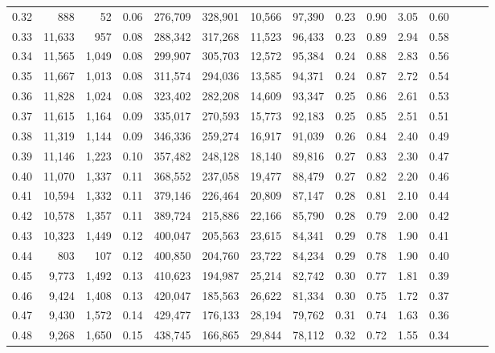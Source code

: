 \begin{tabular}{rrrrrrrrrrrrrrr}
0.32 &     888 &     52 &  0.06 &  276,709 &  328,901 &   10,566 &   97,390 &  0.23 &  0.90 &  3.05 &      0.60 \\
0.33 &  11,633 &    957 &  0.08 &  288,342 &  317,268 &   11,523 &   96,433 &  0.23 &  0.89 &  2.94 &      0.58 \\
0.34 &  11,565 &  1,049 &  0.08 &  299,907 &  305,703 &   12,572 &   95,384 &  0.24 &  0.88 &  2.83 &      0.56 \\
0.35 &  11,667 &  1,013 &  0.08 &  311,574 &  294,036 &   13,585 &   94,371 &  0.24 &  0.87 &  2.72 &      0.54 \\
0.36 &  11,828 &  1,024 &  0.08 &  323,402 &  282,208 &   14,609 &   93,347 &  0.25 &  0.86 &  2.61 &      0.53 \\
0.37 &  11,615 &  1,164 &  0.09 &  335,017 &  270,593 &   15,773 &   92,183 &  0.25 &  0.85 &  2.51 &      0.51 \\
0.38 &  11,319 &  1,144 &  0.09 &  346,336 &  259,274 &   16,917 &   91,039 &  0.26 &  0.84 &  2.40 &      0.49 \\
0.39 &  11,146 &  1,223 &  0.10 &  357,482 &  248,128 &   18,140 &   89,816 &  0.27 &  0.83 &  2.30 &      0.47 \\
0.40 &  11,070 &  1,337 &  0.11 &  368,552 &  237,058 &   19,477 &   88,479 &  0.27 &  0.82 &  2.20 &      0.46 \\
0.41 &  10,594 &  1,332 &  0.11 &  379,146 &  226,464 &   20,809 &   87,147 &  0.28 &  0.81 &  2.10 &      0.44 \\
0.42 &  10,578 &  1,357 &  0.11 &  389,724 &  215,886 &   22,166 &   85,790 &  0.28 &  0.79 &  2.00 &      0.42 \\
0.43 &  10,323 &  1,449 &  0.12 &  400,047 &  205,563 &   23,615 &   84,341 &  0.29 &  0.78 &  1.90 &      0.41 \\
0.44 &     803 &    107 &  0.12 &  400,850 &  204,760 &   23,722 &   84,234 &  0.29 &  0.78 &  1.90 &      0.40 \\
0.45 &   9,773 &  1,492 &  0.13 &  410,623 &  194,987 &   25,214 &   82,742 &  0.30 &  0.77 &  1.81 &      0.39 \\
0.46 &   9,424 &  1,408 &  0.13 &  420,047 &  185,563 &   26,622 &   81,334 &  0.30 &  0.75 &  1.72 &      0.37 \\
0.47 &   9,430 &  1,572 &  0.14 &  429,477 &  176,133 &   28,194 &   79,762 &  0.31 &  0.74 &  1.63 &      0.36 \\
0.48 &   9,268 &  1,650 &  0.15 &  438,745 &  166,865 &   29,844 &   78,112 &  0.32 &  0.72 &  1.55 &      0.34 \\

\end{tabular}
